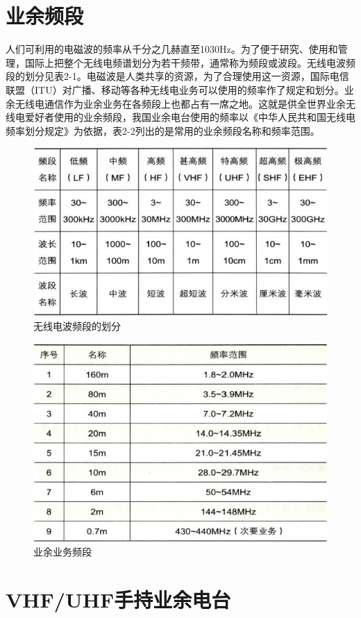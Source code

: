 \documentclass[12pt,UTF8]{ctexbook}
\begin{document}
\section{业余频段}

人们可利用的电磁波的频率从千分之几赫直至1030Hz。为了便于研究、使用和管理，国际上把整个无线电频谱划分为若干频带，通常称为频段或波段。无线电波频段的划分见表2-1。电磁波是人类共享的资源，为了合理使用这一资源，国际电信联盟（ITU）对广播、移动等各种无线电业务可以使用的频率作了规定和划分。业余无线电通信作为业余业务在各频段上也都占有一席之地。这就是供全世界业余无线电爱好者使用的业余频段，我国业余电台使用的频率以《中华人民共和国无线电频率划分规定》为依据，表2-2列出的是常用的业余频段名称和频率范围。

\begin{figure}[htbp]
	\centering
	\includegraphics[width=0.7\linewidth]{17}
	\caption{无线电波频段的划分}
	\label{fig:1}
\end{figure}

\begin{figure}[htbp]
	\centering
	\includegraphics[width=0.7\linewidth]{18}
	\caption{业余业务频段}
	\label{fig:1}
\end{figure}

\section{VHF/UHF手持业余电台}
\end{document}
